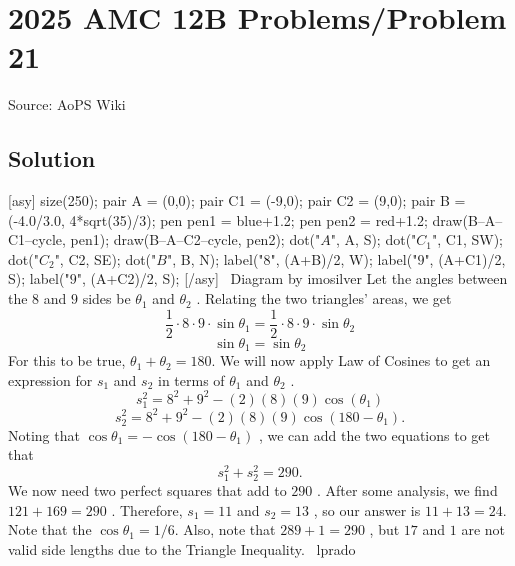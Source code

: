 \documentclass[12pt]{article}
\begin{document}
\section*{{2025 AMC 12B Problems/Problem 21}}
Source: AoPS Wiki

\subsection*{Solution}
[asy] size(250); pair A = (0,0); pair C1 = (-9,0); pair C2 = (9,0); pair B = (-4.0/3.0, 4*sqrt(35)/3); pen pen1 = blue+1.2; pen pen2 = red+1.2; draw(B--A--C1--cycle, pen1); draw(B--A--C2--cycle, pen2); dot("$A$", A, S); dot("$C_1$", C1, SW); dot("$C_2$", C2, SE); dot("$B$", B, N); label("$8$", (A+B)/2, W); label("$9$", (A+C1)/2, S); label("$9$", (A+C2)/2, S); [/asy] ~Diagram by imosilver Let the angles between the $8$ and $9$ sides be $\theta_1$ and $\theta_2$ . Relating the two triangles' areas, we get \[\frac{1}{2} \cdot 8 \cdot 9 \cdot \sin{\theta_1} = \frac{1}{2} \cdot 8 \cdot 9 \cdot \sin{\theta_2}\] \[\sin{\theta_1} = \sin{\theta_2}\] For this to be true, $\theta_1 + \theta_2 = 180.$ We will now apply Law of Cosines to get an expression for $s_1$ and $s_2$ in terms of $\theta_1$ and $\theta_2$ . \[s_1^2 = 8^2 + 9^2 - (2)(8)(9)\cos(\theta_1)\] \[s_2^2 = 8^2 + 9^2 - (2)(8)(9)\cos(180-\theta_1).\] Noting that $\cos{\theta_1} = -\cos{(180 - \theta_1)}$ , we can add the two equations to get that \[s_1^2 + s_2^2 = 290.\] We now need two perfect squares that add to $290$ . After some analysis, we find $121 + 169 = 290$ . Therefore, $s_1 = 11$ and $s_2 = 13$ , so our answer is $11 + 13 = \boxed{24}.$ Note that the $\cos{\theta_1} = 1/6.$ Also, note that $289 + 1 = 290$ , but $17$ and $1$ are not valid side lengths due to the Triangle Inequality. ~lprado
\end{document}
